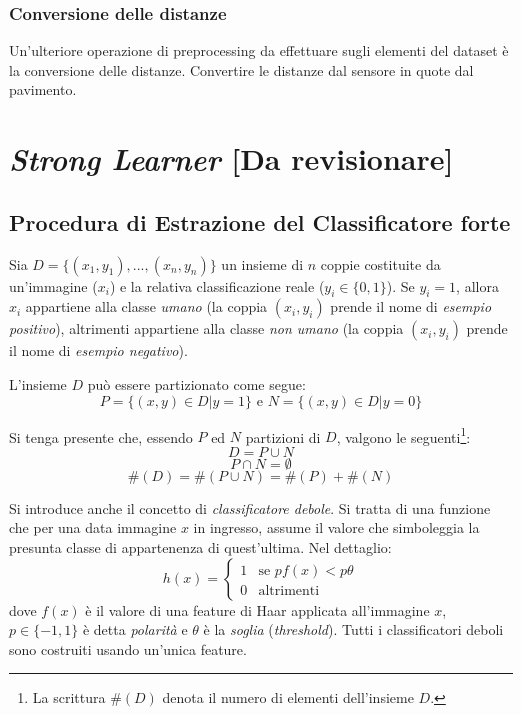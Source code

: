             \subsubsection{Conversione delle distanze}
                Un'ulteriore operazione di preprocessing da effettuare sugli elementi del dataset è la conversione delle distanze.
                Convertire le distanze dal sensore in quote dal pavimento.

    \section{\emph{Strong Learner} [Da revisionare]}
    \label{sec:strong_learner}
        \subsection{Procedura di Estrazione del Classificatore forte}
            Sia $D = \{(x_1, y_1), ..., (x_n, y_n)\}$ un insieme di $n$ coppie costituite da un'immagine ($x_i$) e la relativa classificazione reale ($y_i \in \{ 0, 1 \}$). Se $y_i = 1$, allora $x_i$ appartiene alla classe \emph{umano} (la coppia $(x_i, y_i)$ prende il nome di \emph{esempio positivo}), altrimenti appartiene alla classe \emph{non umano} (la coppia $(x_i, y_i)$ prende il nome di \emph{esempio negativo}).

            L'insieme $D$ può essere partizionato come segue:
            $$P = \{(x, y) \in D | y = 1\} \text{ e } N = \{(x,y) \in D | y = 0\}$$

            Si tenga presente che, essendo $P$ ed $N$ partizioni di $D$, valgono le seguenti\footnote{La scrittura $\#(D)$ denota il numero di elementi dell'insieme $D$.}:
            \begin{equation}
                D = P \cup N
            \end{equation}
            \begin{equation}
                P \cap N = \emptyset
            \end{equation}
            \begin{equation}
                \#(D) = \#(P \cup N) = \#(P) + \#(N)
            \end{equation}

            Si introduce anche il concetto di \emph{classificatore debole}. Si tratta di una funzione che per una data immagine $x$ in ingresso, assume il valore che simboleggia la presunta classe di appartenenza di quest'ultima.
            Nel dettaglio:
            \begin{equation}
                h(x) = \begin{cases}
                1 & \text{se $pf(x) < p\theta$}\\
                0 & \text{altrimenti}
            \end{cases}
            \end{equation}
            dove $f(x)$ è il valore di una feature di Haar applicata all'immagine $x$, $p \in \{-1,1\}$ è detta \emph{polarità} e $\theta$ è la \emph{soglia} (\emph{threshold}). Tutti i classificatori deboli sono costruiti usando un'unica feature.

